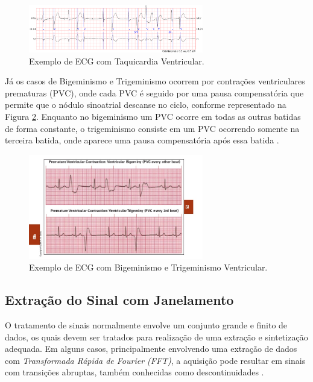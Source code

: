 \documentclass[conference]{IEEEtran}
\begin{document}
\begin{figure}[!h]
	\centering
	\includegraphics[width=3in]{img/ecgTaquicardiaVentricular}
	\caption{Exemplo de ECG com Taquicardia Ventricular.}
	\label{ecgTaquicardiaVentricular}
\end{figure}

Já os casos de Bigeminismo e Trigeminismo ocorrem por contrações ventriculares prematuras (PVC), onde cada PVC é seguido por uma pausa compensatória que permite que o nódulo sinoatrial descanse no ciclo, conforme representado na Figura \ref{arritmiaBigeminismoTrigeminismo}. Enquanto no bigeminismo um PVC ocorre em todas as outras batidas de forma constante, o trigeminismo consiste em um PVC ocorrendo somente na terceira batida, onde aparece uma pausa compensatória após essa batida \cite{wanderer09}.

\begin{figure}[!h]
	\centering
	\includegraphics[width=3in]{img/arritmiaBigeminismoTrigeminismo}
	\caption{Exemplo de ECG com Bigeminismo e Trigeminismo Ventricular.}
	\label{arritmiaBigeminismoTrigeminismo}
\end{figure}

\subsection{Extração do Sinal com Janelamento}

O tratamento de sinais normalmente envolve um conjunto grande e finito de dados, os quais devem ser tratados para realização de uma extração e sintetização adequada. Em alguns casos, principalmente envolvendo uma extração de dados com \textit{Transformada Rápida de Fourier (FFT)}, a aquisição pode resultar em sinais com transições abruptas, também conhecidas como descontinuidades \cite{ni16}. 
\end{document}
